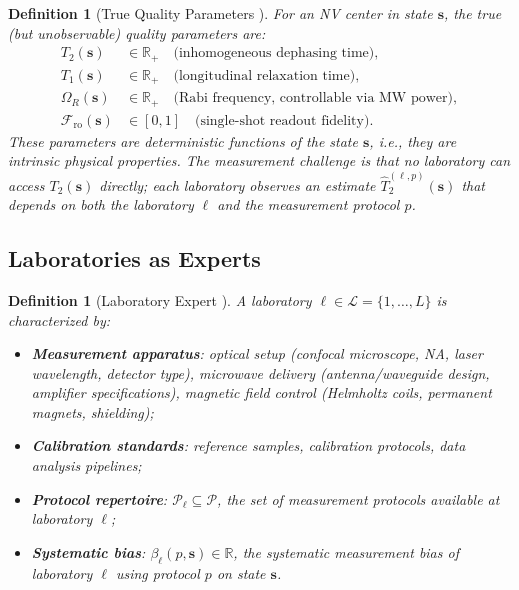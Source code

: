 \documentclass[11pt,a4paper]{article}
\newtheorem{definition}[theorem]{Definition}
\theoremstyle{definition}
\newcommand{\R}{\mathbb{R}}
\newcommand{\cL}{\mathcal{L}}
\newcommand{\cP}{\mathcal{P}}
\newcommand{\Ttwo}{T_2}
\newcommand{\Tone}{T_1}
\newcommand{\NV}{NV}
\newcommand{\RabiFreq}{\Omega_R}
\newcommand{\FidReadout}{\mathcal{F}_{\text{ro}}}
\begin{document}
\begin{definition}[True Quality Parameters ]
\label{def:quality}
For an \NV{} center in state $\mathbf{s}$, the true (but unobservable) quality
parameters are:
\begin{align}
    \Ttwo(\mathbf{s}) &\in \R_+ \quad \text{(inhomogeneous dephasing time)}, \\
    \Tone(\mathbf{s}) &\in \R_+ \quad \text{(longitudinal relaxation time)}, \\
    \RabiFreq(\mathbf{s}) &\in \R_+ \quad \text{(Rabi frequency, controllable via MW power)}, \\
    \FidReadout(\mathbf{s}) &\in [0,1] \quad \text{(single-shot readout fidelity)}.
\end{align}
These parameters are deterministic functions of the state $\mathbf{s}$,
i.e., they are intrinsic physical properties. The measurement challenge
is that no laboratory can access $\Ttwo(\mathbf{s})$ directly; each
laboratory observes an estimate $\widehat{T}_2^{(\ell, p)}(\mathbf{s})$
that depends on both the laboratory $\ell$ and the measurement protocol $p$.
\end{definition}

\subsection{Laboratories as Experts}

\begin{definition}[Laboratory Expert ]
\label{def:lab}
A laboratory $\ell \in \cL = \{1, \dots, L\}$ is characterized by:
\begin{itemize}[nosep]
    \item \textbf{Measurement apparatus}: optical setup (confocal microscope,
    NA, laser wavelength, detector type), microwave delivery (antenna/waveguide
    design, amplifier specifications), magnetic field control (Helmholtz coils,
    permanent magnets, shielding);
    \item \textbf{Calibration standards}: reference samples, calibration
    protocols, data analysis pipelines;
    \item \textbf{Protocol repertoire}: $\cP_\ell \subseteq \cP$, the set of
    measurement protocols available at laboratory $\ell$;
    \item \textbf{Systematic bias}: $\beta_\ell(p, \mathbf{s}) \in \R$, the
    systematic measurement bias of laboratory $\ell$ using protocol $p$ on
    state $\mathbf{s}$.
\end{itemize}
\end{definition}
\end{document}
